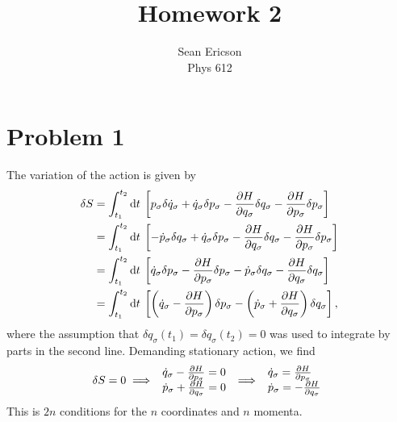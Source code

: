 \documentclass[12pt]{article}
\newcommand{\cint}[2]{\int_{#1}^{#2}}
\newcommand{\cintd}[3]{\cint{#1}{#2}\dd#3\:}
\begin{document}
\title{Homework 2}
\author{Sean Ericson \\ Phys 612}
\maketitle

\section*{Problem 1}
The variation of the action is given by
\begin{align*}
    \delta S &= \cintd{t_1}{t_2}{t} \left[p_{\sigma}\delta\dot{q}_{\sigma} + \dot{q}_{\sigma}\delta p_{\sigma} - \pdv{H}{q_{\sigma}}\delta q_{\sigma} - \pdv{H}{p_{\sigma}}\delta p_{\sigma}\right] \\
    &= \cintd{t_1}{t_2}{t} \left[-\dot{p}_{\sigma}\delta q_{\sigma} + \dot{q}_{\sigma}\delta p_{\sigma} - \pdv{H}{q_{\sigma}}\delta q_{\sigma} - \pdv{H}{p_{\sigma}}\delta p_{\sigma}\right] \\
    &= \cintd{t_1}{t_2}{t} \left[\dot{q}_{\sigma}\delta p_{\sigma} - \pdv{H}{p_{\sigma}}\delta p_{\sigma} - \dot{p}_{\sigma}\delta q_{\sigma} - \pdv{H}{q_{\sigma}}\delta q_{\sigma} \right] \\
    &= \cintd{t_1}{t_2}{t} \left[\left(\dot{q}_{\sigma} - \pdv{H}{p_{\sigma}}\right)\delta p_{\sigma} - \left(\dot{p}_{\sigma} + \pdv{H}{q_{\sigma}}\right)\delta q_{\sigma}\right],
\end{align*}
where the assumption that $\delta q_{\sigma}(t_1) = \delta q_{\sigma}(t_2) = 0$ was used to integrate by parts in the second line. Demanding stationary action, we find
\[
\delta S = 0 \implies
\begin{array}{l}
    \dot{q}_{\sigma} - \pdv{H}{p_{\sigma}} = 0  \\
    \dot{p}_{\sigma} + \pdv{H}{q_{\sigma}} = 0
\end{array} \implies
\begin{array}{l}
    \dot{q}_{\sigma} = \pdv{H}{p_{\sigma}} \\
    \dot{p}_{\sigma} = -\pdv{H}{q_{\sigma}}
\end{array}
\]
This is $2n$ conditions for the $n$ coordinates and $n$ momenta.
\end{document}
